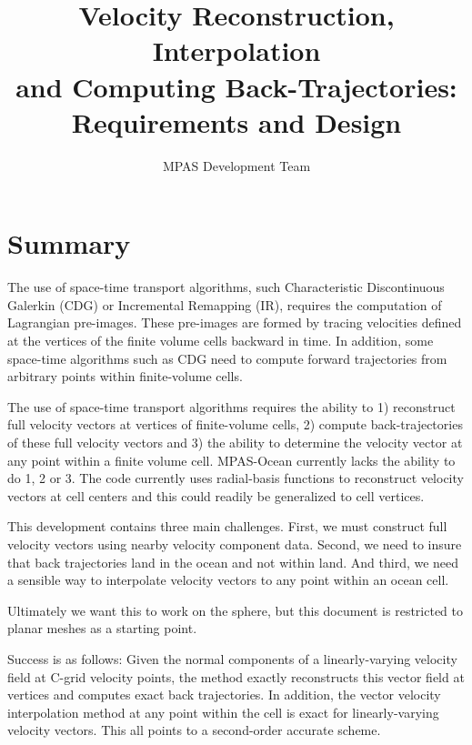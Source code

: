 \documentclass[11pt]{report}
\begin{document}
\title{Velocity Reconstruction, Interpolation \\ and Computing Back-Trajectories: \\
Requirements and Design}
\author{MPAS Development Team}

\maketitle
\tableofcontents


\chapter{Summary}

The use of space-time transport algorithms, such Characteristic Discontinuous Galerkin (CDG) or Incremental Remapping (IR), requires the computation of Lagrangian pre-images. These pre-images are formed by tracing velocities defined at the vertices of the finite volume cells backward in time. In addition, some space-time algorithms such as CDG need to compute forward trajectories from arbitrary points within finite-volume cells.

The use of space-time transport algorithms requires the ability to 1) reconstruct full velocity vectors at vertices of finite-volume cells, 2) compute back-trajectories of these full velocity vectors and 3) the ability to determine the velocity vector at any point within a finite volume cell. MPAS-Ocean currently lacks the ability to do 1, 2 or 3. The code currently uses radial-basis functions to reconstruct velocity vectors at cell centers and this could readily be generalized to cell vertices.

This development contains three main challenges. First, we must construct full velocity vectors using nearby velocity component data. Second, we need to insure that back trajectories land in the ocean and not within land. And third, we need a sensible way to interpolate velocity vectors to any point within an ocean cell.

Ultimately we want this to work on the sphere, but this document is restricted to planar meshes as a starting point.

Success is as follows: Given the normal components of a linearly-varying velocity field at C-grid velocity points, the method exactly reconstructs this vector field at vertices and computes exact back trajectories. In addition, the vector velocity interpolation method at any point within the cell is exact for linearly-varying velocity vectors. This all points to a second-order accurate scheme. 
\end{document}
